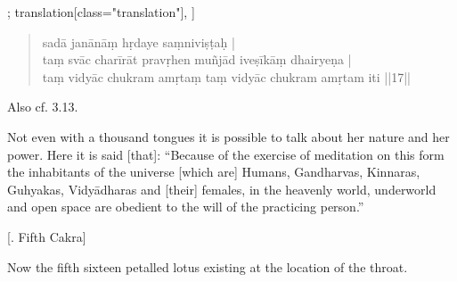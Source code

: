 \begin{alignment}[
   texts=edition[class="edition"];
    translation[class="translation"],
  ]
\begin{translation}
\begin{tlate}
{\begin{quote}
    sadā janānāṃ hṛdaye saṃniviṣṭaḥ |\\
taṃ svāc charīrāt pravṛhen muñjād iveṣīkāṃ dhairyeṇa |\\
taṃ vidyāc chukram amṛtaṃ taṃ vidyāc chukram amṛtam iti ||17||\end{quote}
Also cf.  3.13.}
Not even with a thousand tongues it is possible to talk about her nature and her power. Here it is said [that]: ``Because of the exercise of meditation on this form the inhabitants of the universe [which are] Humans, Gandharvas, Kinnaras, Guhyakas, Vidyādharas and [their] females, in the heavenly world, underworld and open space are obedient to the will of the practicing person.''\textsuperscript{\coro{[\lowroman{25}]}}\vfill
\vfill
     \smallskip
     \centerline{\textrm{\small{[.\textsuperscript{} Fifth Cakra]}}}
     \label{cakra5trans}
     \smallskip
 \indent Now the fifth sixteen petalled lotus existing at the location of the throat.    
    \end{tlate}
  \end{translation}
  \ekdpb*{}
\end{alignment}
